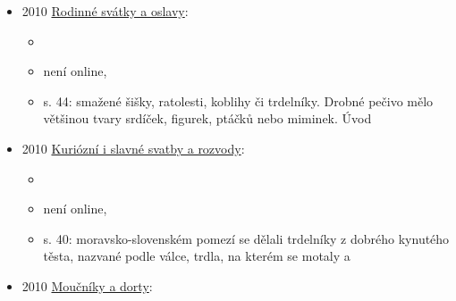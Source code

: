 \begin{itemize}
\begin{itemize}
    \begin{itemize}
    \tightlist
    \item
      opakuje historku o Gvadánim, ale jak se trdelník dostal do
      Němčiček není známo, jsou tu ale mimořádně populární
    \item
      jsou z mléka, cukru, tří druhy tuku, káčení sádlo, mouka,
      kvasnice, sůl, citronová kůra a nadrobno nakrájená ořechová jádra
    \item
      vyválíme dlouhé válečky, namotáme na trdlo a potíráme máčadlem
      (teplé mléko a máslo) a posypeme ořechy.
    \item
      peče se nad žhavými uhlíky, dřív v selských pecích, které se
      vytápěly révovím z vinic, dneska na ohništi s pouřitím tvrdého
      dřeva
    \item
      o znovuobjevení tradice v Němčičkách se zasloužily v během
      posledního desetiletí několik zdejších šikovných kuchařek
    \item
      jejich pečení bylo dříve rodinnou záležitostí, nejčastěji na
      křtiny,
    \item
      zmiňuje článek Jiřího Pavelčíka (Malovaný kraj 6/2007), kde se
      zmiňuje o náplních tvarohových, makových a ořechových. autor o
      makových a tvarohových nikdy neslyšel, ale letos byl v Hustopečích
      stánek, kde měl různé náplně, třeba i kokosové
    \end{itemize}
  \item
    němčické trdelníky dostaly certifikát v krajském kole soutěže
    vesnice roku 2009
  \end{itemize}
\item
  2010
  \href{https://www.digitalniknihovna.cz/mzk/uuid/uuid:b28951a0-23b4-11e9-b427-005056827e51}{Rodinné
  svátky a oslavy}:

  \begin{itemize}
  \tightlist
  \item
  \item
    není online, 
  \item
    s. 44: smažené šišky, ratolesti, koblihy či trdelníky. Drobné pečivo
    mělo většinou tvary srdíček, figurek, ptáčků nebo miminek. Úvod
  \end{itemize}
\item
  2010
  \href{https://www.digitalniknihovna.cz/mzk/uuid/uuid:eaf71f50-04f6-11e8-b1a1-005056827e52}{Kuriózní
  i slavné svatby a rozvody}:

  \begin{itemize}
  \tightlist
  \item
  \item
    není online, 
  \item
    s. 40: moravsko-slovenském pomezí se dělali trdelníky z dobrého
    kynutého těsta, nazvané podle válce, trdla, na kterém se motaly a
  \end{itemize}
\item
  2010
  \href{https://www.digitalniknihovna.cz/mzk/uuid/uuid:38cbcee0-02c2-11e5-9506-005056827e51}{Moučníky
  a dorty}:


\end{itemize}
